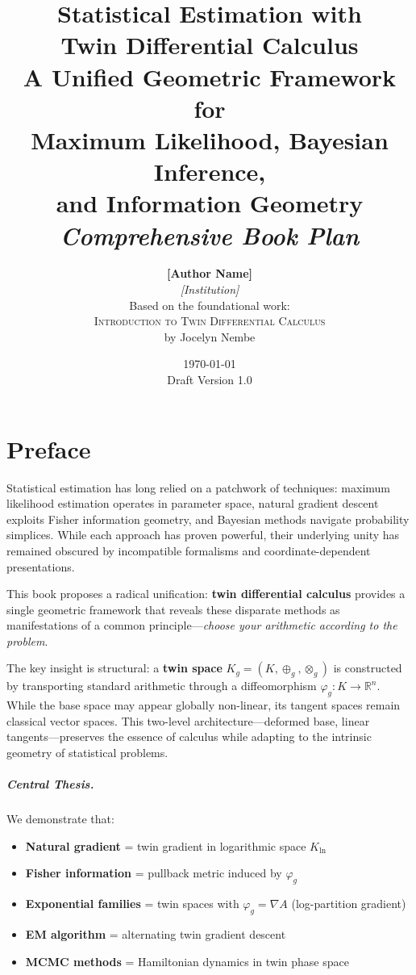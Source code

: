 \documentclass[11pt,twoside]{book}
\title{
    \vspace{-2cm}
    {\Huge \textbf{Statistical Estimation with\\[0.3cm] Twin Differential Calculus}}\\[1.5cm]
    {\Large A Unified Geometric Framework for\\[0.2cm] Maximum Likelihood, Bayesian Inference,\\[0.2cm] and Information Geometry}\\[2cm]
    {\large \textit{Comprehensive Book Plan}}
}
\author{
    \textbf{[Author Name]}\\[0.3cm]
    \textit{[Institution]}\\[0.5cm]
    Based on the foundational work:\\
    \textsc{Introduction to Twin Differential Calculus}\\
    by Jocelyn Nembe
}
\date{\today\\[1cm]\small Draft Version 1.0}
\theoremstyle{plain}
\theoremstyle{definition}
\theoremstyle{remark}
\newcommand{\R}{\mathbb{R}}
\newcommand{\tplus}{\oplus_g}
\newcommand{\ttimes}{\otimes_g}
\newcommand{\Kg}{K_g}
\newcommand{\Kln}{K_{\ln}}
\begin{document}
\frontmatter

\maketitle


\chapter*{Preface}

Statistical estimation has long relied on a patchwork of techniques: maximum likelihood estimation operates in parameter space, natural gradient descent exploits Fisher information geometry, and Bayesian methods navigate probability simplices. While each approach has proven powerful, their underlying unity has remained obscured by incompatible formalisms and coordinate-dependent presentations.

This book proposes a radical unification: \textbf{twin differential calculus} provides a single geometric framework that reveals these disparate methods as manifestations of a common principle—\textit{choose your arithmetic according to the problem}.

The key insight is structural: a \textbf{twin space} $\Kg = (K, \tplus, \ttimes)$ is constructed by transporting standard arithmetic through a diffeomorphism $\varphi_g : K \to \R^n$. While the base space may appear globally non-linear, its tangent spaces remain classical vector spaces. This two-level architecture—deformed base, linear tangents—preserves the essence of calculus while adapting to the intrinsic geometry of statistical problems.

\paragraph{Central Thesis.} We demonstrate that:
\begin{itemize}
    \item \textbf{Natural gradient} = twin gradient in logarithmic space $\Kln$
    \item \textbf{Fisher information} = pullback metric induced by $\varphi_g$
    \item \textbf{Exponential families} = twin spaces with $\varphi_g = \nabla A$ (log-partition gradient)
    \item \textbf{EM algorithm} = alternating twin gradient descent
    \item \textbf{MCMC methods} = Hamiltonian dynamics in twin phase space
\end{itemize}
\end{document}
